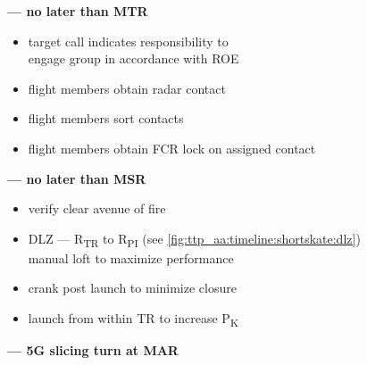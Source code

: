 \begin{checklistenumerate}[start=0]
    \blueitem[Target] \textbf{--- no later than MTR}
    \label{subsec:ttp_aa:timeline:shortskate:target}
    \begin{itemize}
        \item target call indicates responsibility to \\
        engage group in accordance with ROE
        \item flight members obtain radar contact
    \end{itemize}

    \blueitem[Sort]
    \label{subsec:ttp_aa:timeline:shortskate:sort}
    \begin{itemize}
        \item flight members sort contacts
        \item flight members obtain FCR lock on assigned contact
    \end{itemize}

     \textbf{--- no later than MSR}
    \label{subsec:ttp_aa:timeline:shortskate:shoot}
    \begin{itemize} 
        \item verify clear avenue of fire
        \item DLZ --- R\textsubscript{TR} to R\textsubscript{PI} 
        \hfill (see \cref{fig:ttp_aa:timeline:shortskate:dlz})\\
        manual loft to maximize performance
        \item crank post launch to minimize closure
        \item launch from within TR to increase P\textsubscript{K}
    \end{itemize}
    
    \blueitem[Abort]%
    \label{subsec:ttp_aa:timeline:shortskate:abort}
    \textbf{--- 5G slicing turn at MAR}
\end{checklistenumerate}


\marginfigrestore